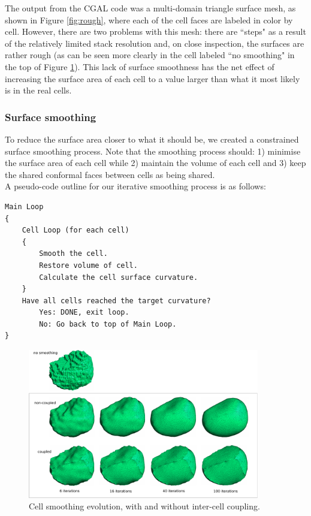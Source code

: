 \documentclass[a4paper,10pt]{article}
\begin{document}
The output from the CGAL code was a multi-domain triangle surface mesh, as shown in Figure \ref{fig:rough}, where each of the cell faces are labeled in color by cell. However, there are two problems with this mesh: there are ``steps" as a result of the relatively limited stack resolution and, on close inspection, the surfaces are rather rough (as can be seen more clearly in the cell labeled ``no smoothing" in the top of Figure \ref{fig:cell_morph}). This lack of surface smoothness has the net effect of increasing the surface area of each cell to a value larger than what it most likely is in the real cells.\\

\subsubsection{Surface smoothing}

To reduce the surface area closer to what it should be, we created a constrained surface smoothing process. Note that the smoothing process should: 1) minimise the surface area of each cell while 2) maintain the volume of each cell and 3) keep the shared conformal faces between cells as being shared.\\

A pseudo-code outline for our iterative smoothing process is as follows:
\begin{verbatim}
Main Loop
{
    Cell Loop (for each cell)
    {
        Smooth the cell.
        Restore volume of cell.
        Calculate the cell surface curvature.
    }
    Have all cells reached the target curvature?
        Yes: DONE, exit loop.
        No: Go back to top of Main Loop.  
}
\end{verbatim}

\begin{figure}[H]
\begin{center}
\includegraphics[width=0.9\textwidth]{images/evolution.pdf}
\end{center}
\caption{Cell smoothing evolution, with and without inter-cell coupling.}
\label{fig:cell_morph}
\end{figure}
\end{document}
